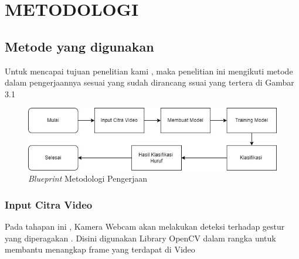\chapter{METODOLOGI}


\section{Metode yang digunakan}

Untuk mencapai tujuan penelitian kami , maka penelitian ini mengikuti metode dalam pengerjaannya sesuai yang sudah dirancang ssuai yang tertera di Gambar 3.1

\begin{figure} [ht] \centering
  \includegraphics[scale=0.5]{gambar/Metodologi_TA_Baru.jpg}
  \caption{\emph{Blueprint} Metodologi Pengerjaan}
  \label{fig:Blueprint}
\end{figure}

\subsection{Input Citra Video}
Pada tahapan ini , Kamera Webcam akan melakukan deteksi terhadap gestur yang diperagakan . Disini digunakan Library OpenCV dalam rangka untuk membantu menangkap frame yang terdapat di Video 


